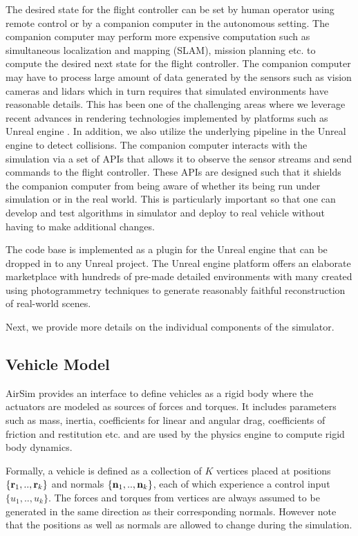 \documentclass[graybox]{svmult}
\newcommand{\Name}{AirSim\xspace}
\begin{document}
The desired state for the flight controller can be set by human operator using remote control or by a companion computer in the autonomous setting. The companion computer may perform more expensive computation such as simultaneous localization and mapping (SLAM), mission planning etc. to compute the desired next state for the flight controller. The companion computer may have to process large amount of data generated by the sensors such as vision cameras and lidars which in turn requires that simulated environments have reasonable details. This has been one of the challenging areas where we leverage recent advances in rendering technologies implemented by platforms such as Unreal engine \cite{karis2013real}. In addition, we also utilize the underlying pipeline in the Unreal engine to detect collisions. The companion computer interacts with the simulation via a set of APIs that allows it to observe the sensor streams and send commands to the flight controller. These APIs are designed such that it shields the companion computer from being aware of whether its being run under simulation or in the real world. This is particularly important so that one can develop and test algorithms in simulator and deploy to real vehicle without having to make additional changes.

The code base is implemented as a plugin for the Unreal engine that can be dropped in to any Unreal project. The Unreal engine platform offers an elaborate marketplace with hundreds of pre-made detailed environments with many created using photogrammetry techniques \cite{openworld2015} to generate reasonably faithful reconstruction of real-world scenes.

Next, we provide more details on the individual components of the simulator.

\subsection{Vehicle Model}
\label{sec:Vehicle}
\Name provides an interface to define vehicles as a rigid body where the actuators are modeled as sources of forces and torques. It includes parameters such as mass, inertia, coefficients for linear and angular drag, coefficients of friction and restitution etc. and are used by the physics engine to compute rigid body dynamics. 

Formally, a vehicle is defined as a collection of $K$ vertices placed at positions $\{{\bf r}_1, .., {\bf r}_k\}$ and normals $\{{\bf n}_1, .., {\bf n}_k\}$, each of which experience a control input $\{u_1, .., u_k\}$. The forces and torques from vertices are always assumed to be generated in the same direction as their corresponding normals. However note that the positions as well as normals are allowed to change during the simulation.
\end{document}
